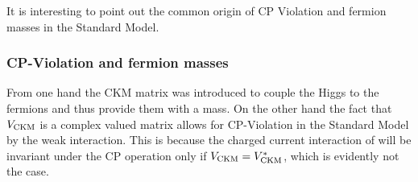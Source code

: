 It is interesting to point out the common origin of CP Violation and fermion masses in the Standard Model\cite{KM-mechanism}.
\subsubsection{CP-Violation and fermion masses}
From one hand the CKM matrix was introduced to couple the Higgs to the fermions and thus provide them with a mass.
On the other hand the fact that $V_{\rm CKM}$ is a complex valued matrix allows for CP-Violation in the
Standard Model by the weak interaction. This is because the charged current interaction of 
will be invariant under the CP operation only if $V_{\rm CKM}=V_{\rm CKM}^*$, which is evidently not the case.
